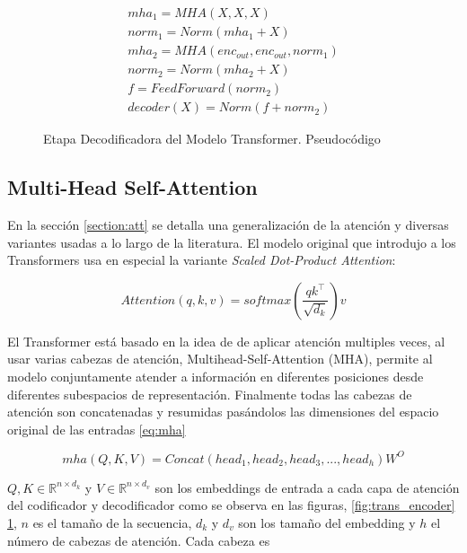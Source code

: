 \begin{figure}[ht!]
\begin{minipage}{.5\textwidth}
        \begin{equation*}
            \begin{split}
                mha_1 = MHA(X, X, X)\\
                norm_1 = Norm( mha_1 + X)\\
                mha_2 = MHA(enc_{out}, enc_{out}, norm_1)\\
                norm_2 = Norm( mha_2 + X)\\
                f = FeedForward(norm_2)\\
                decoder(X) = Norm(f + norm_2)
            \end{split}
            \label{eq:trans_dec}
        \end{equation*}
    \end{minipage}
    \caption{Etapa Decodificadora del Modelo Transformer. Pseudocódigo}
    \label{fig:trans_decoder}
\end{figure}

\subsection{Multi-Head Self-Attention}

En la sección \ref{section:att} se detalla una generalización de la atención y diversas variantes usadas
a lo largo de la literatura. El modelo original que introdujo a los Transformers usa en especial la variante
\textit{Scaled Dot-Product Attention}\cite{Vaswani}:

\begin{equation}
    Attention(q, k, v) = softmax(\frac{q k^\top}{\sqrt{d_k}}) v
    \label{eq:trans_att_gen}
\end{equation}

El Transformer está basado en la idea de de aplicar atención multiples veces, al usar varias cabezas
de atención, Multihead-Self-Attention (MHA), permite  al modelo conjuntamente atender a información
en diferentes posiciones desde diferentes subespacios de representación. Finalmente todas las cabezas
de atención son concatenadas y resumidas pasándolos las dimensiones del espacio original de las
entradas \ref{eq:mha}

\begin{equation}
    mha(Q, K, V) = Concat(head_1,head_2,head_3,..., head_h)W^O
    \label{eq:mha}
\end{equation}

$Q, K \in \mathbb{R}^{n \times d_{k}}$ y $V \in \mathbb{R}^{n \times d_{v}}$ son los embeddings de
entrada a cada capa de atención del codificador y decodificador como se observa en las figuras,
\ref{fig:trans_encoder} \ref{fig:trans_decoder}, $n$ es el tamaño de la
secuencia, $d_k$ y $d_v$ son los tamaño del embedding y $h$ el número de cabezas de atención. Cada cabeza es


